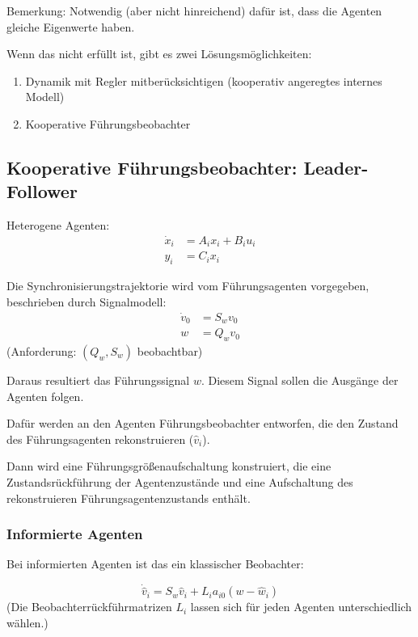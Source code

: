 Bemerkung: Notwendig (aber nicht hinreichend) dafür ist, dass die Agenten gleiche Eigenwerte haben.

Wenn das nicht erfüllt ist, gibt es zwei Lösungsmöglichkeiten:
\begin{enumerate}
    \item Dynamik mit Regler mitberücksichtigen (kooperativ angeregtes internes Modell)
    \item Kooperative Führungsbeobachter
\end{enumerate}


\subsection{Kooperative Führungsbeobachter: Leader-Follower}
\label{sec:koop_beob}

Heterogene Agenten:
\begin{align}
    \dot{x}_i &= A_i x_i + B_i u_i \\
    y_i &= C_i x_i
\end{align}

Die Synchronisierungstrajektorie wird vom Führungsagenten vorgegeben, beschrieben
durch Signalmodell:
\begin{align}
    \dot{v}_0 &= S_w v_0 \\
    w &= Q_w v_0
\end{align}
(Anforderung: $(Q_w, S_w)$ beobachtbar)

Daraus resultiert das Führungssignal $w$.
Diesem Signal sollen die Ausgänge der Agenten folgen.

Dafür werden an den Agenten Führungsbeobachter entworfen, die den Zustand des
Führungsagenten rekonstruieren ($\hat{v}_i$).

Dann wird eine Führungsgrößenaufschaltung konstruiert, die eine Zustandsrückführung
der Agentenzustände und eine Aufschaltung des rekonstruieren
Führungsagentenzustands enthält.


\subsubsection{Informierte Agenten}

Bei informierten Agenten ist das ein klassischer Beobachter:

\begin{equation}
    \dot{\hat{v}}_i = S_w \hat{v}_i + L_i a_{i0} (w-\hat{w}_i)
\end{equation}
(Die Beobachterrückführmatrizen $L_i$ lassen sich für jeden Agenten
unterschiedlich wählen.)


